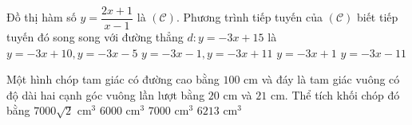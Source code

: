 \begin{ex}%
Đồ thị hàm số $y=\dfrac{2x+1}{x-1}$ là $(\mathscr{C})$. Phương trình tiếp tuyến của $(\mathscr{C})$ biết tiếp tuyến đó song song với đường thẳng $d: y=-3x+15$ là
\choice
{$y=-3x+10,y=-3x-5$}
{\True $y=-3x-1, y=-3x+11$}
{$y=-3x+1$}
{$y=-3x-11$}
\end{ex}

\begin{ex}%
Một hình chóp tam giác có đường cao bằng $100$ cm và đáy là tam giác vuông có độ dài hai cạnh góc vuông lần lượt bằng $20$ cm và $21$ cm. Thể tích khối chóp đó bằng
\choice
{$7000\sqrt{2}$ cm$^3$}
{$6000$ cm$^3$}
{\True $7000$ cm$^3$}
{$6213$ cm$^3$}
\end{ex}

